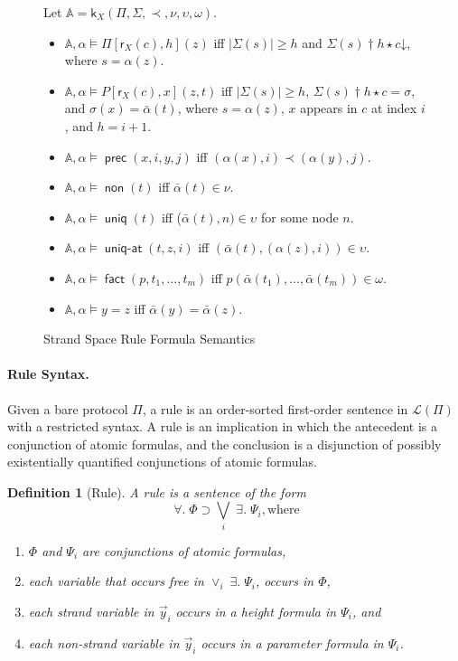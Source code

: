 \documentclass[12pt]{article}
\newcommand{\cn}[1]{\ensuremath{\operatorname{\mathsf{#1}}}}
\newcommand{\all}[1]{\mathop{\forall#1\mathpunct.}}
\newcommand{\some}[1]{\mathop{\exists#1\mathpunct.}}
\newcommand{\prefix}[2]{#1\dagger#2}
\newcommand{\defd}{\mathord\downarrow}
\newcommand{\inst}{\star}
\newcommand{\lang}{\mathcal{L}}
\newcommand{\skel}{\mathbb{A}}
\newcommand{\skl}{\mathsf{k}}
\newcommand{\length}[1]{\ensuremath{|#1|}}
\newcommand{\role}{\mathsf{r}}
\newcommand{\ssp}{\Sigma}
\newtheorem{definition}{Definition}
\begin{document}
\begin{figure}
  Let $\skel=\skl_X(\Pi,\ssp,\prec,\nu,\upsilon,\omega)$.
  \begin{itemize}
  \item $\skel,\alpha\models\Pi[\role_X(c),h](z)$ iff
    $\length{\ssp(s)}\geq h$ and
    $\prefix{\ssp(s)}{h}\inst c\defd$, where $s=\alpha(z)$.
  \item $\skel,\alpha\models P[\role_X(c),x](z,t)$ iff
    $\length{\ssp(s)}\geq h$,
    $\prefix{\ssp(s)}{h}\inst c=\sigma$, and
    $\sigma(x)=\bar\alpha(t)$,
    where $s=\alpha(z)$, $x$ appears in $c$ at index $i$, and $h=i+1$.
  \item $\skel,\alpha\models\cn{prec}(x,i,y,j)$ iff
    $(\alpha(x),i)\prec(\alpha(y),j)$.
  \item $\skel,\alpha\models\cn{non}(t)$ iff $\bar\alpha(t)\in\nu$.
  \item $\skel,\alpha\models\cn{uniq}(t)$ iff
    ($\bar\alpha(t),n)\in\upsilon$ for some node $n$.
  \item $\skel,\alpha\models\cn{uniq-at}(t,z,i)$ iff
    $(\bar\alpha(t),(\alpha(z),i))\in\upsilon$.
  \item $\skel,\alpha\models\cn{fact}(p,t_1,\ldots,t_m)$ iff
    $p(\bar\alpha(t_1),\ldots,\bar\alpha(t_m))\in\omega$.
  \item $\skel,\alpha\models y=z$ iff $\bar\alpha(y)=\bar\alpha(z)$.
  \end{itemize}
  \caption{Strand Space Rule Formula Semantics}\label{fig:semantics}
\end{figure}

\paragraph{Rule Syntax.}

Given a bare protocol $\Pi$, a rule is an order-sorted first-order
sentence in $\lang(\Pi)$ with a restricted syntax.  A rule is an
implication in which the antecedent is a conjunction of atomic
formulas, and the conclusion is a disjunction of possibly
existentially quantified conjunctions of atomic formulas.

\begin{definition}[Rule]\label{def:rule}
  A \emph{rule} is a sentence of the form
  \[\all{\vec{x}}\Phi\supset\bigvee_i\some{\vec{y}_i}\Psi_i,\mbox{
    where}\]
  \begin{enumerate}
  \item $\Phi$ and $\Psi_i$ are conjunctions of atomic formulas,
  \item each variable that occurs free in $\vee_i\some{\vec{y}_i}\Psi_i$,
    occurs in $\Phi$,
  \item each strand variable in $\vec{y}_i$ occurs in a height formula
    in $\Psi_i$, and
  \item each non-strand variable in $\vec{y}_i$ occurs in a parameter
    formula in $\Psi_i$.
  \end{enumerate}
\end{definition}
\end{document}
